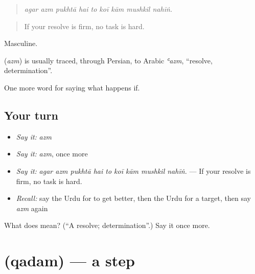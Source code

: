 \begin{quote}
        
\end{quote}

\begin{quote}
\emph{agar azm pukhtā hai to koī kām mushkil nahīṅ.}
\end{quote}

\begin{quote}
If your resolve is firm, no task is hard.
\end{quote}

Masculine.

\begin{cousinweb}
\textbf{} (\emph{azm}) is usually traced, through Persian, to Arabic \emph{ʿazm}, \textquotedblleft{}resolve, determination\textquotedblright{}.
\end{cousinweb}

\begin{grammarlens}[title={What you've built}]
One more word for saying what happens if.
\end{grammarlens}

\subsection*{Your turn}
\begin{itemize}
\raggedright
  \item \emph{Say it:} \emph{azm}
  \item \emph{Say it:} \emph{azm}, once more
  \item \emph{Say it:} \emph{agar azm pukhtā hai to koī kām mushkil nahīṅ.} — If your resolve is firm, no task is hard.
  \item \emph{Recall:} say the Urdu for to get better, then the Urdu for a target, then say \emph{azm} again
\end{itemize}

\begin{tcolorbox}[breakable,colback=teal!4,colframe=teal!35!black,title={Before you move on}]
What does  mean? (\textquotedblleft{}A resolve; determination\textquotedblright{}.) Say it once more.
\end{tcolorbox}
\section[\texorpdfstring{\ur{قدم} (qadam)}{قدم (qadam)}]{ (qadam) — a step}

